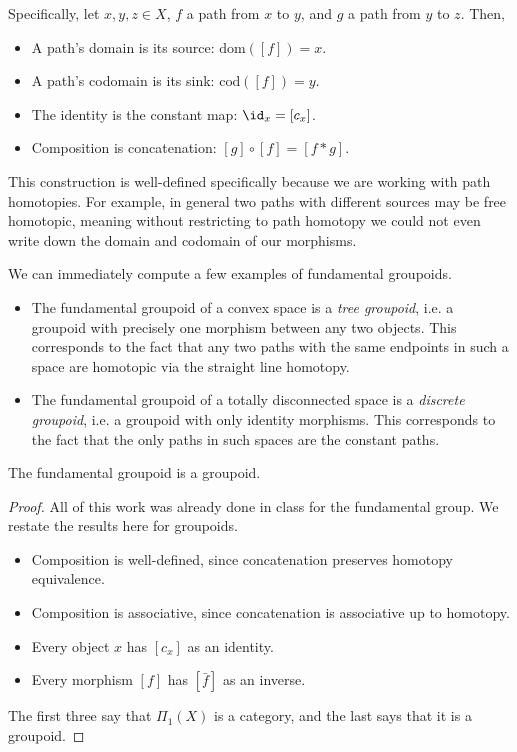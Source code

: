 Specifically, let $x,y,z\in X$, $f$ a path from $x$ to $y$, and $g$ a path from
$y$ to $z$. Then,

\begin{itemize}
	\item A path's domain is its source: $\text{dom}([f]) = x$.
	\item A path's codomain is its sink: $\text{cod}([f]) = y$.
	\item The identity is the constant map: $\id_x = [c_x]$.
	\item Composition is concatenation: $[g]\circ [f] = [f*g]$.
\end{itemize}

This construction is well-defined specifically because we are working with path
homotopies. For example, in general two paths with different sources may be
free homotopic, meaning without restricting to path homotopy we could not even
write down the domain and codomain of our morphisms.

\begin{ex}
	We can immediately compute a few examples of fundamental groupoids.
	\begin{itemize}
		\item The fundamental groupoid of a convex space is a \emph{tree groupoid},
		      i.e. a groupoid with precisely one morphism between any two objects.
		      This corresponds to the fact that any two paths with the same
		      endpoints in such a space are homotopic via the straight line
		      homotopy.
		\item The fundamental groupoid of a totally disconnected space is a
		      \emph{discrete groupoid}, i.e. a groupoid with only identity morphisms.
		      This corresponds to the fact that the only paths in such spaces are the
		      constant paths.
	\end{itemize}
\end{ex}

\begin{prop}\label{fund-is-groupoid}
	The fundamental groupoid is a groupoid.
\end{prop}

\begin{proof}
	All of this work was already done in class for the fundamental group. We restate the results here for groupoids.
	\begin{itemize}
		\item Composition is well-defined, since concatenation preserves homotopy equivalence.
		\item Composition is associative, since concatenation is associative up to homotopy.
		\item Every object $x$ has $[c_x]$ as an identity.
		\item Every morphism $[f]$ has $[\bar{f}]$ as an inverse.
	\end{itemize}

	The first three say that $\Pi_1(X)$ is a category, and the last says that it is a groupoid.
\end{proof}


